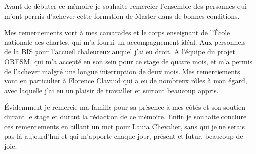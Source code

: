 Avant de débuter ce mémoire je souhaite remercier l'ensemble des personnes qui m'ont permis d'achever cette formation de Master dans de bonnes conditions. 
\par
Mes remerciements vont à mes camarades et le corps enseignant de l'École nationale des chartes, qui m'a fourni un accompagnement idéal. Aux personnels de la BIS pour l'accueil chaleureux auquel j'ai eu droit. A l'équipe du projet ORESM, qui m'a accepté en son sein pour ce stage de quatre mois, et m'a permis de l'achever malgré une longue interruption de deux mois.  Mes remerciements vont en particulier à Florence Clavaud qui a eu de nombreux rôles à mon égard, avec laquelle j'ai eu un plaisir de travailler et surtout beaucoup appris. 
\par 
Évidemment je remercie ma famille pour sa présence à mes côtés et son soutien durant le stage et durant la rédaction de ce mémoire. Enfin je souhaite conclure ces remerciements en aillant un mot pour Laura Chevalier, sans qui je ne serais pas là aujourd'hui et qui m'apporte chaque jour, présent et futur, beaucoup de joie.